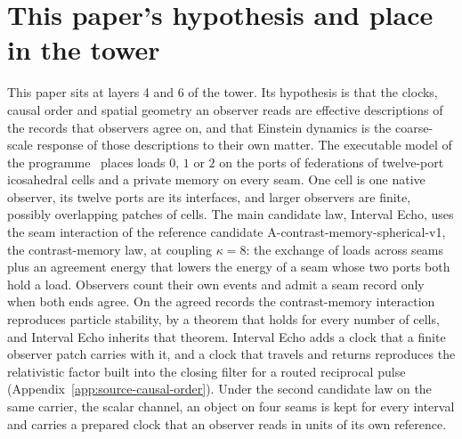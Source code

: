 \documentclass[11pt]{article}
\begin{document}


\section*{This paper's hypothesis and place in the tower}

This paper sits at layers 4 and 6 of the tower. Its hypothesis is that the
clocks, causal order and spatial geometry an observer reads are effective
descriptions of the records that observers agree on, and that Einstein
dynamics is the coarse-scale response of those descriptions to their own
matter. The executable model of the programme~\cite{ophmodel} places loads
$0$, $1$ or $2$ on the ports of federations of twelve-port icosahedral cells
and a private memory on every seam. One cell is one native observer, its
twelve ports are its interfaces, and larger observers are finite, possibly
overlapping patches of cells. The main candidate law, Interval Echo, uses
the seam interaction of the reference candidate
A-contrast-memory-spherical-v1, the contrast-memory law, at coupling
$\kappa=8$: the exchange of loads across seams plus an agreement energy that
lowers the energy of a seam whose two ports both hold a load. Observers
count their own events and admit a seam record only when both ends agree. On
the agreed records the contrast-memory interaction reproduces particle
stability, by a theorem that holds for every number of cells, and Interval
Echo inherits that theorem. Interval Echo adds a clock that a finite
observer patch carries with it, and a clock that travels and returns reproduces the relativistic factor built into the closing filter for a routed reciprocal pulse (Appendix~\ref{app:source-causal-order}). Under the
second candidate law on the same carrier, the scalar channel, an object on
four seams is kept for every interval and carries a prepared clock that an
observer reads in units of its own reference.
\end{document}
